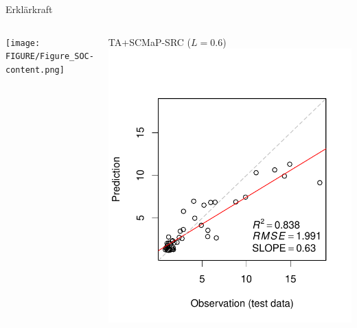 \begin{frame}{Erklärkraft}
\begin{columns}
\column{5.5cm}
\centering\texttt{[image: FIGURE/Figure\_SOC-content.png]}

\column{5.5cm}
\begin{block}{\alert{TA+SCMaP-SRC} ($L=0.6$)}
\centering\includegraphics[width=1\textwidth]{FIGURE/Figure_Model_Accuracy_TA-SM_L06.pdf}
\end{block}
\end{columns}
\end{frame}


